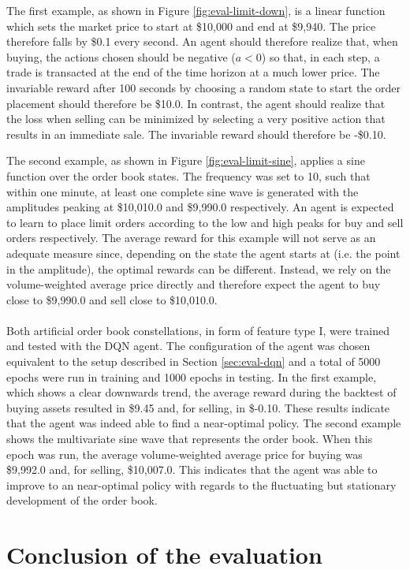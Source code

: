The first example, as shown in Figure \ref{fig:eval-limit-down}, is a linear function which sets the market price to start at \$10,000 and end at \$9,940.
The price therefore falls by \$0.1 every second.
An agent should therefore realize that, when buying, the actions chosen should be negative ($a<0$) so that, in each step, a trade is transacted at the end of the time horizon at a much lower price.
The invariable reward after 100 seconds by choosing a random state to start the order placement should therefore be \$10.0.
In contrast, the agent should realize that the loss when selling can be minimized by selecting a very positive action that results in an immediate sale.
The invariable reward should therefore be -\$0.10.

The second example, as shown in Figure \ref{fig:eval-limit-sine}, applies a sine function over the order book states.
The frequency was set to 10, such that within one minute, at least one complete sine wave is generated with the amplitudes peaking at \$10,010.0 and \$9,990.0 respectively.
An agent is expected to learn to place limit orders according to the low and high peaks for buy and sell orders respectively.
The average reward for this example will not serve as an adequate measure since, depending on the state the agent starts at (i.e. the point in the amplitude), the optimal rewards can be different.
Instead, we rely on the volume-weighted average price directly and therefore expect the agent to buy close to \$9,990.0 and sell close to \$10,010.0.
\\
\\
Both artificial order book constellations, in form of feature type I, were trained and tested with the DQN agent.
The configuration of the agent was chosen equivalent to the setup described in Section \ref{sec:eval-dqn} and a total of 5000 epochs were run in training and 1000 epochs in testing.
In the first example, which shows a clear downwards trend, the average reward during the backtest of buying assets resulted in \$9.45 and, for selling, in \$-0.10.
These results indicate that the agent was indeed able to find a near-optimal policy.
The second example shows the multivariate sine wave that represents the order book. When this epoch was run, the average volume-weighted average price for buying was \$9,992.0 and, for selling, \$10,007.0.
This indicates that the agent was able to improve to an near-optimal policy with regards to the fluctuating but stationary development of the order book.

\section{Conclusion of the evaluation}

